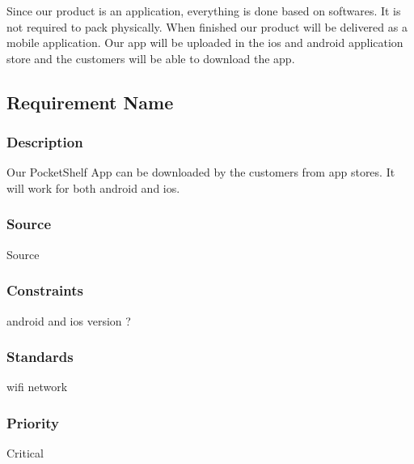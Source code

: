 Since our product is an application, everything is done based on softwares. It is not required to pack physically. When finished our product will be delivered as a mobile application. Our app will be uploaded in the ios and android application store and the customers will be able to download the app.

\subsection{Requirement Name}
\subsubsection{Description}
Our PocketShelf App can be downloaded by the customers from app stores. It will work for both android and ios.
\subsubsection{Source}
Source
\subsubsection{Constraints}
android and ios version ?
\subsubsection{Standards}
wifi network
\subsubsection{Priority}
Critical